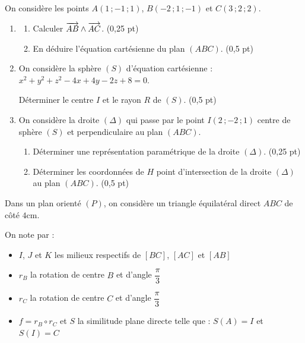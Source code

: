 

On considère les points $A(1\,;-1\,;1)$, $B(-2\,;1\,;-1)$ et $C(3\,;2\,;2)$.

\begin{enumerate}
	\item
	\begin{enumerate}
		\item Calculer $\overrightarrow{AB} \wedge \overrightarrow{AC}$. \hfill (0,25 pt)
		\item En déduire l'équation cartésienne du plan $(ABC)$. \hfill (0,5 pt)
	\end{enumerate}
	\item On considère la sphère $(S)$ d'équation cartésienne : $x^2+y^2+z^2-4x+4y-2z+8 = 0$.

	Déterminer le centre $I$ et le rayon $R$ de $(S)$. \hfill (0,5 pt)
	\item On considère la droite $(\Delta)$ qui passe par le point $I(2\,;-2\,;1)$ centre de sphère $(S)$ et perpendiculaire au plan $(ABC)$.
	\begin{enumerate}
		\item Déterminer une représentation paramétrique de la droite $(\Delta)$. \hfill (0,25 pt)
		\item Déterminer les coordonnées de $H$ point d'intersection de la droite $(\Delta)$ au plan $(ABC)$. \hfill (0,5 pt)
	\end{enumerate}
\end{enumerate}




Dans un plan orienté $(P)$, on considère un triangle équilatéral direct $ABC$ de côté $4\text{cm}$.

On note par :
\begin{itemize}[label=\textbullet]
	\item $I$, $J$ et $K$ les milieux respectifs de $[BC]$, $[AC]$ et $[AB]$
	\item $r_B$ la rotation de centre $B$ et d'angle $\dfrac{\pi}{3}$
	\item $r_C$ la rotation de centre $C$ et d'angle $\dfrac{\pi}{3}$
	\item $f = r_B \circ r_C$ et $S$ la similitude plane directe telle que : $S(A) = I$ et $S(I) = C$
\end{itemize}

